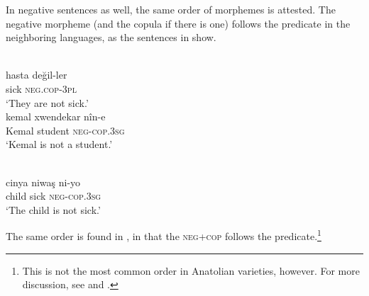 \documentclass[output=paper]{langsci/langscibook}
\begin{document}





\noindent In negative sentences as well, the same order of morphemes is attested. The negative morpheme (and the {copula} if there is one) follows the predicate in the neighboring languages, as the sentences in  show.


\begin{exe}
\ex \label{copneg}
		\begin{xlist}
		\ex {} \\\label{copnegtk}\gll hasta 	değil-ler		\\
    sick	\textsc{neg.cop-3pl} \\
       \glt `They are not sick.'
	\ex {} \\\label{copnegkr}  \gll kemal	xwendekar  	nîn-e	 \\
    Kemal	student		\textsc{neg-cop.3sg}\\
    \glt    `Kemal is not a student.'

		\ex {} \\ \label{copnegza} \gll  cinya 	niwaş   ni-yo\\
        child	sick	\textsc{neg-cop.3sg} \\
        \glt `The child is not sick.'
        \end{xlist}

\end{exe}


\noindent  The same order is found in  , in that the \textsc{neg+cop} follows the predicate.\footnote{This is not the most common order in Anatolian  varieties, however. For more discussion, see \cite{Jastrow2011anatolian} and \cite{Akkus2016,Akkus2017}.}
\end{document}
